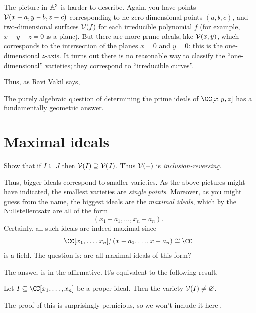 \documentclass[11pt]{scrreprt}
\begin{document}
The picture in $\mathbb A^3$ is harder to describe.
Again, you have points $\mathcal V(x-a, y-b, z-c)$ corresponding to 
he zero-dimensional points $(a,b,c)$, and two-dimensional surfaces
$\mathcal V(f)$ for each irreducible polynomial $f$ (for example, $x+y+z=0$ is a plane).
But there are more prime ideals, like $\mathcal V(x,y)$, which corresponds to the
intersection of the planes $x=0$ and $y=0$: this is the one-dimensional $z$-axis.
It turns out there is no reasonable way to classify the ``one-dimensional'' varieties;
they correspond to ``irreducible curves''.

Thus, as Ravi Vakil \cite{ref:vakil} says,
\begin{moral}
	The purely algebraic question of determining the prime ideals of $\CC[x,y,z]$
	has a fundamentally geometric answer.
\end{moral}

\section{Maximal ideals}
\begin{ques}
	Show that if $I \subseteq J$ then $\mathcal V(I) \supseteq \mathcal V(J)$.
	Thus $\mathcal V(-)$ is \emph{inclusion-reversing}.
\end{ques}
Thus, bigger ideals correspond to smaller varieties.
As the above pictures might have indicated, the smallest varieties are \emph{single points}.
Moreover, as you might guess from the name, the biggest ideals are the \emph{maximal ideals},
which by the Nullstellentsatz are all of the form
\[ \left( x_1-a_1, \dots, x_n-a_n \right). \]
Certainly, all such ideals are indeed maximal since
\[ \CC[x_1, \dots, x_n] / \left( x-a_1, \dots, x-a_n \right) \cong \CC \]
is a field.
The question is: are all maximal ideals of this form?

The answer is in the affirmative. It's equivalent to the following result.
\begin{theorem}
	Let $I \subsetneq \CC[x_1, \dots, x_n]$ be a proper ideal.
	Then the variety $\mathcal V(I) \neq \varnothing$.
\end{theorem}
The proof of this is surprisingly pernicious, so
we won't include it here .
\end{document}
